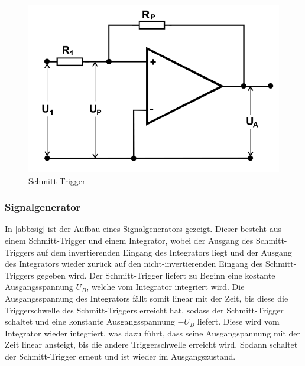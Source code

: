 \begin{figure}[h!]
 	\centering
 	\includegraphics[width=\textwidth]{img/schmitt.png}
 	\caption{Schmitt-Trigger \cite{FP}}
 	\label{abb:sch}
\end{figure}

\subsubsection{Signalgenerator}
In \autoref{abb:sig} ist der Aufbau eines Signalgenerators gezeigt. Dieser besteht aus einem Schmitt-Trigger und einem Integrator, wobei der Ausgang des Schmitt-Triggers auf dem invertierenden Eingang des Integrators liegt und der Ausgang des Integrators wieder zurück auf den nicht-invertierenden Eingang des Schmitt-Triggers gegeben wird. Der Schmitt-Trigger liefert zu Beginn eine kostante Ausgangsspannung $U_B$, welche vom Integrator integriert wird. Die Ausgangsspannung des Integrators fällt somit linear mit der Zeit, bis diese die Triggerschwelle des Schmitt-Triggers erreicht hat, sodass der Schmitt-Trigger schaltet und eine konstante Ausgangsspannung $-U_B$ liefert. Diese wird vom Integrator wieder integriert, was dazu führt, dass seine Ausgangspannung mit der Zeit linear ansteigt, bis die andere Triggerschwelle erreicht wird. Sodann schaltet der Schmitt-Trigger erneut und ist wieder im Ausgangszustand.

